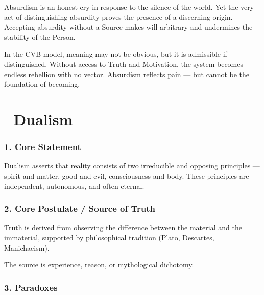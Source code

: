 \documentclass[12pt]{article}
\begin{document}
Absurdism is an honest cry in response to the silence of the world. Yet the very act of distinguishing absurdity proves the presence of a discerning origin. Accepting absurdity without a Source makes will arbitrary and undermines the stability of the Person.

In the CVB model, meaning may not be obvious, but it is admissible if distinguished. Without access to Truth and Motivation, the system becomes endless rebellion with no vector. Absurdism reflects pain — but cannot be the foundation of becoming.

\section*{🔷 Dualism}

\subsubsection*{1. Core Statement}

Dualism asserts that reality consists of two irreducible and opposing principles — spirit and matter, good and evil, consciousness and body. These principles are independent, autonomous, and often eternal.

\subsubsection*{2. Core Postulate / Source of Truth}

Truth is derived from observing the difference between the material and the immaterial, supported by philosophical tradition (Plato, Descartes, Manichaeism).

The source is experience, reason, or mythological dichotomy.

\subsubsection*{3. Paradoxes}
\end{document}
